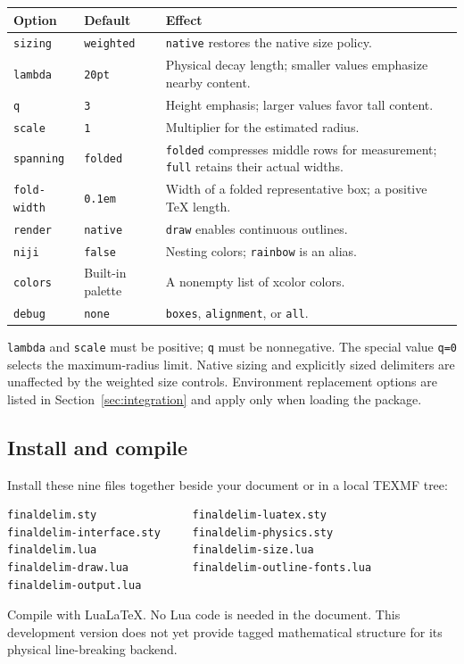 \documentclass[11pt,a4paper]{article}
\begin{document}
\begin{center}
\begin{tabular}{@{}llp{86mm}@{}}\toprule
Option&Default&Effect\\\midrule
\texttt{sizing}&\texttt{weighted}&\texttt{native} restores the native size policy.\\
\texttt{lambda}&\texttt{20pt}&Physical decay length; smaller values emphasize nearby content.\\
\texttt{q}&\texttt{3}&Height emphasis; larger values favor tall content.\\
\texttt{scale}&\texttt{1}&Multiplier for the estimated radius.\\
\texttt{spanning}&\texttt{folded}&\texttt{folded} compresses middle rows for measurement; \texttt{full} retains their actual widths.\\
\texttt{fold-width}&\texttt{0.1em}&Width of a folded representative box; a positive TeX length.\\
\texttt{render}&\texttt{native}&\texttt{draw} enables continuous outlines.\\
\texttt{niji}&\texttt{false}&Nesting colors; \texttt{rainbow} is an alias.\\
\texttt{colors}&Built-in palette&A nonempty list of xcolor colors.\\
\texttt{debug}&\texttt{none}&\texttt{boxes}, \texttt{alignment}, or \texttt{all}.\\\bottomrule
\end{tabular}
\end{center}
\texttt{lambda} and \texttt{scale} must be positive; \texttt{q} must be
nonnegative. The special value \texttt{q=0} selects the maximum-radius limit.
Native sizing and explicitly sized delimiters are unaffected by the weighted
size controls. Environment replacement options are listed in
Section~\ref{sec:integration} and apply only when loading the package.

\newpage
\subsection{Install and compile}
Install these nine files together beside your document or in a local TEXMF tree:
\begin{lstlisting}[language={}]
finaldelim.sty               finaldelim-luatex.sty
finaldelim-interface.sty     finaldelim-physics.sty
finaldelim.lua               finaldelim-size.lua
finaldelim-draw.lua          finaldelim-outline-fonts.lua
finaldelim-output.lua
\end{lstlisting}
Compile with LuaLaTeX. No Lua code is needed in the document.
This development version does not yet provide tagged mathematical structure
for its physical line-breaking backend.
\end{document}
